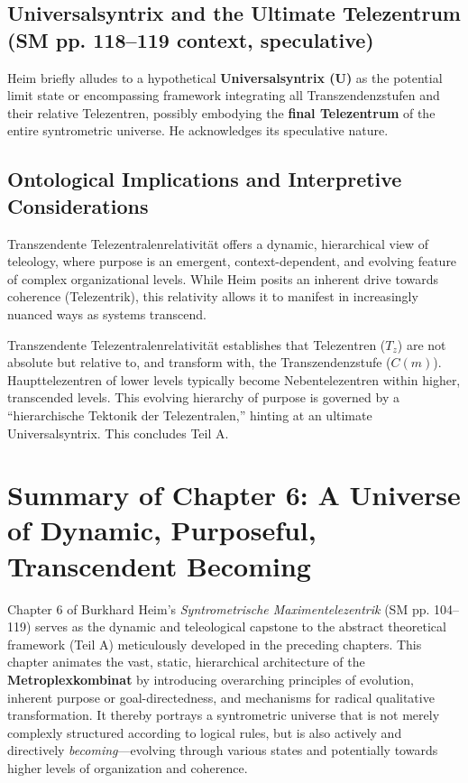 \documentclass[
    12pt,              %
    a4paper,           %
    headings=normal,   %
    twoside=true,      %
    BCOR=8mm,          %
]{scrbook}
\newcommand{\q}[1]{\enquote{#1}}
\newcommand{\universalquantor}{\bm{U}}
\newcommand{\telezentrum}{T_z}
\newcommand{\transzendenzstufe}[1]{C(#1)}
\begin{document}
\subsection{Universalsyntrix and the Ultimate Telezentrum (SM pp. 118–119 context, speculative)}
\label{sec:ch6_universalsyntrix_ultimate_telezentrum}
Heim briefly alludes to a hypothetical \textbf{Universalsyntrix (\(\universalquantor\))} as the potential limit state or encompassing framework integrating all Transzendenzstufen and their relative Telezentren, possibly embodying the \textbf{final Telezentrum} of the entire syntrometric universe. He acknowledges its speculative nature.

\subsection{Ontological Implications and Interpretive Considerations}
\label{sec:ch6_ontological_implications}
Transzendente Telezentralenrelativität offers a dynamic, hierarchical view of teleology, where purpose is an emergent, context-dependent, and evolving feature of complex organizational levels. While Heim posits an inherent drive towards coherence (Telezentrik), this relativity allows it to manifest in increasingly nuanced ways as systems transcend.

Transzendente Telezentralenrelativität establishes that Telezentren (\(\telezentrum\)) are not absolute but relative to, and transform with, the Transzendenzstufe (\(\transzendenzstufe{m}\)). Haupttelezentren of lower levels typically become Nebentelezentren within higher, transcended levels. This evolving hierarchy of purpose is governed by a \q{hierarchische Tektonik der Telezentralen,} hinting at an ultimate Universalsyntrix. This concludes Teil A.

\section{Summary of Chapter 6: A Universe of Dynamic, Purposeful, Transcendent Becoming}
\label{sec:ch6_summary}

Chapter 6 of Burkhard Heim’s \textit{Syntrometrische Maximentelezentrik} (SM pp. 104–119) serves as the dynamic and teleological capstone to the abstract theoretical framework (Teil A) meticulously developed in the preceding chapters. This chapter animates the vast, static, hierarchical architecture of the \textbf{Metroplexkombinat} by introducing overarching principles of evolution, inherent purpose or goal-directedness, and mechanisms for radical qualitative transformation. It thereby portrays a syntrometric universe that is not merely complexly structured according to logical rules, but is also actively and directively \textit{becoming}—evolving through various states and potentially towards higher levels of organization and coherence.
\end{document}
